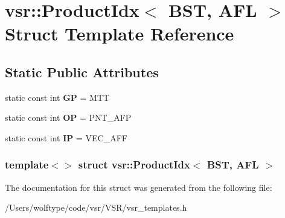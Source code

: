 \hypertarget{structvsr_1_1_product_idx_3_01_b_s_t_00_01_a_f_l_01_4}{\section{vsr\-:\-:Product\-Idx$<$ B\-S\-T, A\-F\-L $>$ Struct Template Reference}
\label{structvsr_1_1_product_idx_3_01_b_s_t_00_01_a_f_l_01_4}
}
\subsection*{Static Public Attributes}
\begin{DoxyCompactItemize}
\item 
\hypertarget{structvsr_1_1_product_idx_3_01_b_s_t_00_01_a_f_l_01_4_a9a9f77bfdb770dd1790d9572a3af2827}{static const int {\bfseries G\-P} = M\-T\-T}\label{structvsr_1_1_product_idx_3_01_b_s_t_00_01_a_f_l_01_4_a9a9f77bfdb770dd1790d9572a3af2827}

\item 
\hypertarget{structvsr_1_1_product_idx_3_01_b_s_t_00_01_a_f_l_01_4_a7494b155d7da85289b169278c8411aee}{static const int {\bfseries O\-P} = P\-N\-T\-\_\-\-A\-F\-P}\label{structvsr_1_1_product_idx_3_01_b_s_t_00_01_a_f_l_01_4_a7494b155d7da85289b169278c8411aee}

\item 
\hypertarget{structvsr_1_1_product_idx_3_01_b_s_t_00_01_a_f_l_01_4_a0251696fe6065c576e46d01b8ea77ecb}{static const int {\bfseries I\-P} = V\-E\-C\-\_\-\-A\-F\-F}\label{structvsr_1_1_product_idx_3_01_b_s_t_00_01_a_f_l_01_4_a0251696fe6065c576e46d01b8ea77ecb}

\end{DoxyCompactItemize}
\subsubsection*{template$<$$>$ struct vsr\-::\-Product\-Idx$<$ B\-S\-T, A\-F\-L $>$}



The documentation for this struct was generated from the following file\-:\begin{DoxyCompactItemize}
\item 
/\-Users/wolftype/code/vsr/\-V\-S\-R/vsr\-\_\-templates.\-h\end{DoxyCompactItemize}
